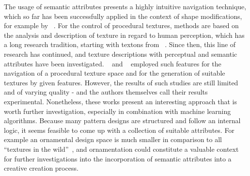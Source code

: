 

The usage of semantic attributes presents a highly intuitive navigation technique, which so far has been successfully applied in the context of shape modifications, for example by \citeauthor*{yumer_2015_sse}~\cite{yumer_2015_sse}. For the control of procedural textures, methods are based on the analysis and description of texture in regard to human perception, which has a long research tradition, starting with textons from \citeauthor*{julesz_1981_tte}~\cite{julesz_1981_tte}. 
Since then, this line of research has continued, and texture descriptions with perceptual \cite{liu_2015_vpp} and semantic~\cite{matthews_2013_eta,cimpoi_2014_dtw} attributes have been investigated. \citeauthor*{dong_2017_ptg}~\cite{dong_2017_ptg} and \citeauthor*{liu_2018_ppt}~\cite{liu_2018_ppt} employed such features for the navigation of a procedural texture space and for the generation of suitable textures by given features. However, the results of such studies are still limited and of varying quality - and the authors themselves \cite{liu_2018_ppt} call their results experimental. Nonetheless, these works present an interesting approach that is worth further investigation, especially in combination with machine learning algorithms. Because many pattern designs are structured and follow an internal logic, it seems feasible to come up with a collection of suitable attributes. For example an ornamental design space is much smaller in comparison to all ``textures in the wild''~\cite{cimpoi_2014_dtw}, and ornamentation could constitute a valuable context for further investigations into the incorporation of semantic attributes into a creative creation process.


